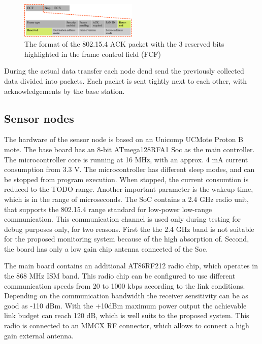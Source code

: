 \documentclass[conference]{IEEEtran}
\begin{document}
\begin{figure}[htbp]
	\centering
	\includegraphics[width=0.5\textwidth]{fig/ack-packet.png}
  \caption{The format of the 802.15.4 ACK packet with the 3 reserved bits highlighted
  in the frame control field (FCF)}
	\label{fig-ack-packet}
\end{figure}

During the actual data transfer each node dend send the
previously collected data divided into packets. Each packet is sent
tightly next to each other, with acknowledgements by the base station.





\subsection{Sensor nodes}

The hardware of the sensor node is based on an Unicomp UCMote Proton B mote.
The base board has an 8-bit ATmega128RFA1 Soc as the main controller. The
microcontroller core is running at 16 MHz, with an approx. 4 mA current
consumption from 3.3 V. The microcontroller has different sleep modes,
and can be stopped from program execution. When stopped, the current consumtion
is reduced to the TODO range. Another important parameter is the wakeup time,
which is in the range of microseconds. The SoC contains a 2.4 GHz radio unit,
that supports the 802.15.4 range standard for low-power low-range communication.
This communication channel is used only during testing for debug purposes only,
for two reasons. First the the 2.4 GHz band is not suitable for the proposed
monitoring system because of the high absorption of. Second, the board has
only a low gain chip antenna connected of the Soc.

The main board contains an additional AT86RF212 radio chip, which operates in
the 868 MHz ISM band. This radio chip can be configured to use different
communication speeds from 20 to 1000 kbps according to the link conditions.
Depending on the communication bandwidth the receiver sensitivity can be as good as
-110 dBm. With the +10dBm maximum power output the achievable link budget can
reach 120 dB, which is well suits to the proposed system. This radio is connected to
an MMCX RF connector, which allows to connect a high gain external antenna.
\end{document}
